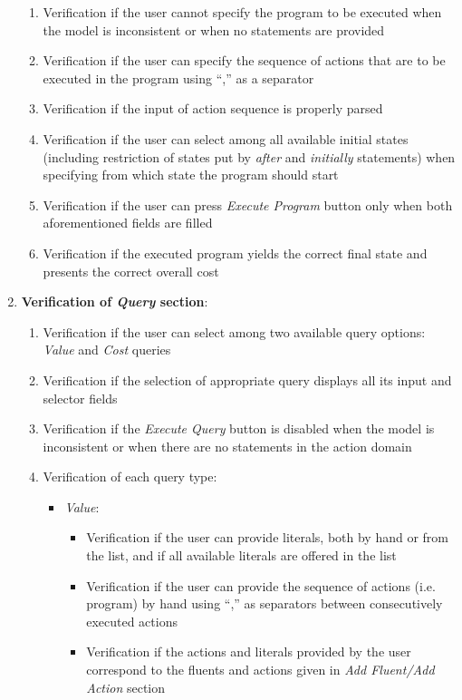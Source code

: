 \documentclass[a4paper]{article}
\begin{document}
\begin{enumerate}
\begin{enumerate}
        \item Verification if the user cannot specify the program to be executed when the model is inconsistent or when no statements are provided
        \item Verification if the user can specify the sequence of actions that are to be executed in the program using ``,'' as a separator
        \item Verification if the input of action sequence is properly parsed
        \item Verification if the user can select among all available initial states (including restriction of states put by \textit{after} and \textit{initially} statements) when specifying from which state the program should start
        \item Verification if the user can press \textit{Execute Program} button only when both aforementioned fields are filled
        \item Verification if the executed program yields the correct final state and presents the correct overall cost
    \end{enumerate}
    \item \textbf{Verification of \textit{Query} section}:
    \begin{enumerate}
        \item Verification if the user can select among two available query options: \textit{Value} and \textit{Cost} queries
        \item Verification if the selection of appropriate query displays all its input and selector fields
        \item Verification if the \textit{Execute Query} button is disabled when the model is inconsistent or when there are no statements in the action domain
        \item Verification of each query type:
        \begin{itemize}
            \item \textit{Value}:
            \begin{itemize}
                \item Verification if the user can provide literals, both by hand or from the list, and if all available literals are offered in the list
                \item Verification if the user can provide the sequence of actions (i.e. program) by hand using ``,'' as separators between consecutively executed actions
                \item Verification if the actions and literals provided by the user correspond to the fluents and actions given in \textit{Add Fluent/Add Action} section

\end{itemize}
\end{itemize}
\end{enumerate}
\end{enumerate}
\end{document}
